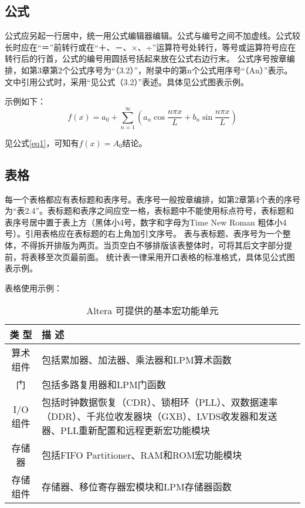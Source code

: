 \documentclass[a4paper,fancyhdr,fntef,UTF8,hyperref,openany,oneside,notitlepage]{book}%
\begin{document}
\subsection{公式}
公式应另起一行居中，统一用公式编辑器编辑。公式与编号之间不加虚线。公式较长时应在“＝”前转行或在“＋、－、×、÷”运算符号处转行，等号或运算符号应在转行后的行首，公式的编号用圆括号括起来放在公式右边行末。
公式序号按章编排，如第3章第2个公式序号为“（3.2）”，附录中的第n个公式用序号“（An）”表示。文中引用公式时，采用“见公式（3.2）”表述。具体见公式图表示例。

示例如下：
\begin{equation}\label{eq1}
  f\left( x \right) = {a_0} + \sum\limits_{n = 1}^\infty  {\left( {{a_n}\cos \frac{{n\pi x}}{L} + {b_n}\sin \frac{{n\pi x}}{L}} \right)}
\end{equation}

见公式\eqref{eq1}，可知有$f\left( x \right) = A_0$结论。

\subsection{表格}
每一个表格都应有表标题和表序号。表序号一般按章编排，如第2章第4个表的序号为“表2.4”。表标题和表序之间应空一格，表标题中不能使用标点符号，表标题和表序号居中置于表上方（黑体小4号，数字和字母为Time New Roman 粗体小4号）。引用表格应在表标题的右上角加引文序号。
表与表标题、表序号为一个整体，不得拆开排版为两页。当页空白不够排版该表整体时，可将其后文字部分提前，将表移至次页最前面。
统计表一律采用开口表格的标准格式，具体见公式图表示例。

表格使用示例：
\renewcommand{\arraystretch}{1.5}%
\begin{table}[!ht]\centering
\caption{Altera 可提供的基本宏功能单元}\label{tab:Altera}
\begin{tabular}{|c|p{25em}|}
   \hline
    类 型 & 描 述 \\ \hline
    算术组件 & 包括累加器、加法器、乘法器和LPM算术函数\\ \hline
    门 & 包括多路复用器和LPM门函数 \\ \hline
    I/O组件 & 包括时钟数据恢复（CDR）、锁相环（PLL）、双数据速率（DDR）、千兆位收发器块（GXB）、LVDS收发器和发送器、PLL重新配置和远程更新宏功能模块 \\ \hline
    存储器 & 包括FIFO Partitioner、RAM和ROM宏功能模块 \\ \hline
    存储组件 & 存储器、移位寄存器宏模块和LPM存储器函数\\ \hline
\end{tabular}
\end{table}
\end{document}
